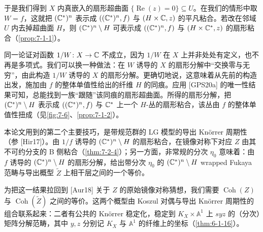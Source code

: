 

于是我们得到 $X$ 内真嵌入的扇形超曲面 $\{\operatorname{Re}(z)=0\}\subseteq U$。在我们的情形中取 $W=f$，这就把 $(\mathbb{C}^*)^n$ 表示成 $((\mathbb{C}^*)^n,f)$ 与 $(H\times\mathbb{C},z)$ 的平凡粘合。若改在邻域 $U$ 内去掉超曲面 $H$，则 $(\mathbb{C}^*)^n\setminus H$ 可表示成 $((\mathbb{C}^*)^n,f)$ 与 $(H\times\mathbb{C}^*,z)$ 的扇形粘合（\ref{prop:7-1-1}）。

同一论证对函数 $1/W\colon X\to\mathbb{C}$ 不成立，因为 $1/W$ 在 $X$ 上并非处处有定义，也不再是多项式。我们可以换一种做法：在 $W$ 诱导的 $X$ 的扇形分解中“交换零与无穷”，由此构造 $1/W$ 诱导的 $X$ 的扇形分解。更确切地说，这意味着从先前的构造出发，施加由 $f$ 的整体单值性给出的纤维 $H$ 的同痕。应用 [GPS20a] 的唯一性结果可知，总能找到一族“跟随”该同痕的扇形超曲面。所得的扇形分解，把 $(\mathbb{C}^*)^n\setminus H$ 表示成 $((\mathbb{C}^*)^n,f)$ 与 $\mathbb{C}^*$ 上一个 $H$-丛的扇形粘合，该丛由 $f$ 的整体单值性扭成（见\ref{fig:7-6}、\ref{prop:7-1-2}）。


本论文用到的第二个主要技巧，是带规范群的 LG 模型的导出 Kn{\"o}rrer 周期性（参 [Hir17]）。由 $1/f$ 诱导的 $(\mathbb{C}^*)^n\setminus H$ 的扇形粘合，在镜像对称下对应 $Z$ 由其不可约分支的 B 侧粘合（\ref{thm:7-2-4}）；另一方面，非常规的分次 $\eta_0$ 意味着：由 $f$ 诱导的 $(\mathbb{C}^*)^n\setminus H$ 的扇形分解，给出带分次 $\eta_0$ 的 $(\mathbb{C}^*)^n\setminus H$ wrapped Fukaya 范畴与导出概型 $\tilde Z$ 上相干层之间的一个等价。

为把这一结果拉回到 [Aur18] 关于 $Z$ 的原始镜像对称猜想，我们需要 $\operatorname{Coh}(Z)$ 与 $\operatorname{Coh}(\tilde Z)$ 之间的等价。这两个概型由 Koszul 对偶与导出 Kn{\"o}rrer 周期性的组合联系起来：二者有公共的 Kn{\"o}rrer 稳定化，稳定到 $K_X\times\mathbb A^1$ 上 $syz$ 的（分次）矩阵分解范畴，其中 $y,z$ 分别记 $K_X$ 与 $\mathbb A^1$ 的纤维上的坐标（\ref{thm:6-1-16}）。


